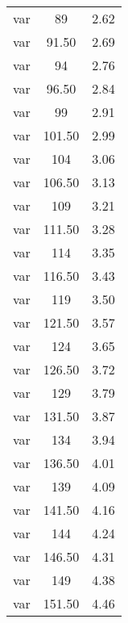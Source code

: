 \begin{table}[h]
\begin{center}
\begin{tabular}{ccc}
var & 89 & 2.62 \\

var & 91.50 & 2.69 \\

var & 94 & 2.76 \\

var & 96.50 & 2.84 \\

var & 99 & 2.91 \\

var & 101.50 & 2.99 \\

var & 104 & 3.06 \\

var & 106.50 & 3.13 \\

var & 109 & 3.21 \\

var & 111.50 & 3.28 \\

var & 114 & 3.35 \\

var & 116.50 & 3.43 \\

var & 119 & 3.50 \\

var & 121.50 & 3.57 \\

var & 124 & 3.65 \\

var & 126.50 & 3.72 \\

var & 129 & 3.79 \\

var & 131.50 & 3.87 \\

var & 134 & 3.94 \\

var & 136.50 & 4.01 \\

var & 139 & 4.09 \\

var & 141.50 & 4.16 \\

var & 144 & 4.24 \\

var & 146.50 & 4.31 \\

var & 149 & 4.38 \\

var & 151.50 & 4.46 \\


\end{tabular}
\end{center}
\end{table}
